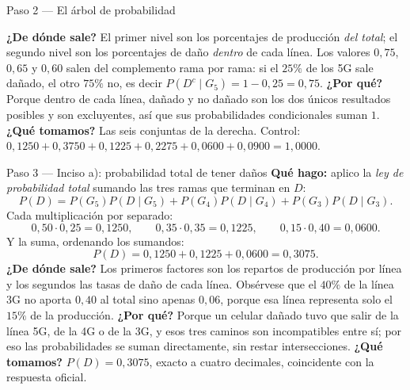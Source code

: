 \documentclass[11pt]{article}
\begin{document}
\begin{sol}
\begin{paso}{Paso 2 --- El árbol de probabilidad}
\begin{center}
\shorthandon{<>}
\end{center}

\textbf{¿De dónde sale?} El primer nivel son los porcentajes de producción \emph{del total}; el segundo nivel son los porcentajes de daño \emph{dentro} de cada línea. Los valores $0,75$, $0,65$ y $0,60$ salen del complemento rama por rama: si el $25\%$ de los 5G sale dañado, el otro $75\%$ no, es decir $P(D^{c}\mid G_5)=1-0,25=0,75$.
\textbf{¿Por qué?} Porque dentro de cada línea, dañado y no dañado son los dos únicos resultados posibles y son excluyentes, así que sus probabilidades condicionales suman $1$.
\textbf{¿Qué tomamos?} Las seis conjuntas de la derecha. Control: $0,1250+0,3750+0,1225+0,2275+0,0600+0,0900=1,0000$.
\end{paso}

\begin{paso}{Paso 3 --- Inciso a): probabilidad total de tener daños}
\textbf{Qué hago:} aplico la \emph{ley de probabilidad total} sumando las tres ramas que terminan en $D$:
\[
P(D)=P(G_5)P(D\mid G_5)+P(G_4)P(D\mid G_4)+P(G_3)P(D\mid G_3).
\]
Cada multiplicación por separado:
\[
0,50\cdot 0,25=0,1250,\qquad 0,35\cdot 0,35=0,1225,\qquad 0,15\cdot 0,40=0,0600 .
\]
Y la suma, ordenando los sumandos:
\[
P(D)=0,1250+0,1225+0,0600=0,3075 .
\]
\textbf{¿De dónde sale?} Los primeros factores son los repartos de producción por línea y los segundos las tasas de daño de cada línea. Obsérvese que el $40\%$ de la línea 3G no aporta $0,40$ al total sino apenas $0,06$, porque esa línea representa solo el $15\%$ de la producción.
\textbf{¿Por qué?} Porque un celular dañado tuvo que salir de la línea 5G, de la 4G o de la 3G, y esos tres caminos son incompatibles entre sí; por eso las probabilidades se suman directamente, sin restar intersecciones.
\textbf{¿Qué tomamos?} $P(D)=0,3075$, exacto a cuatro decimales, coincidente con la respuesta oficial.
\end{paso}


\end{sol}
\end{document}

